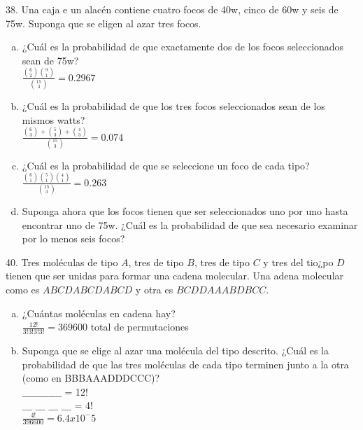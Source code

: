 \documentclass[12pt, letterpaper, spanish]{article}
\begin{document}
	38. Una caja e un alacén contiene cuatro focos de 40w, cinco de 60w y seis de 75w. Suponga que se eligen al azar tres focos.\\
	\begin{enumerate}[a)]
		\item ¿Cuál es la probabilidad de que exactamente dos de los focos seleccionados sean de 75w?\\
		$\displaystyle\frac{\displaystyle{6 \choose 2} \displaystyle{9 \choose 1}}{\displaystyle{15 \choose 3}}=0.2967$
		\item ¿Cuál es la probabilidad de que los tres focos seleccionados sean de los mismos watts?\\
		$\displaystyle\frac{\displaystyle{6 \choose 3} + \displaystyle{5 \choose 3} + \displaystyle{4 \choose 3}}{\displaystyle{15 \choose 3}}=0.074$
		\item ¿Cuál es la probabilidad de que se seleccione un foco de cada tipo?\\
		$\displaystyle\frac{\displaystyle{6 \choose 1}  \displaystyle{5 \choose 1}  \displaystyle{4 \choose 1}}{\displaystyle{15 \choose 3}}=0.263$
		\item Suponga ahora que los focos tienen que ser seleccionados uno por uno hasta encontrar uno de 75w. ¿Cuál es la probabilidad de que sea necesario examinar por lo menos seis focos?\\
	\end{enumerate}

	40. Tres moléculas de tipo $A$, tres de tipo $B$, tres de tipo $C$ y tres del tio¿po $D$ tienen que ser unidas para formar una cadena molecular. Una adena molecular como es $ABCDABCDABCD$ y otra es $BCDDAAABDBCC$.
	\begin{enumerate}[a)]
		\item ¿Cuántas moléculas en cadena hay? \\
		$\displaystyle\frac{12!}{3!3!3!3!}=369600$ total de permutaciones
		\item Suponga que se elige al azar una molécula del tipo descrito. ¿Cuál es la probabilidad de que las tres moléculas de cada tipo terminen junto a la otra (como en BBBAAADDDCCC)?\\
		$\_ \_ \_ \_ \_ \_ \_ \_ \_ \_ \_ \_$ = 12!\\
				$ \_\_\_$ $ \_\_\_$  $ \_\_\_$  $ \_\_\_$  = 4!\\
				$\displaystyle\frac{4!}{396600} = 6.4x10^-5$\\
	\end{enumerate}
\end{document}
